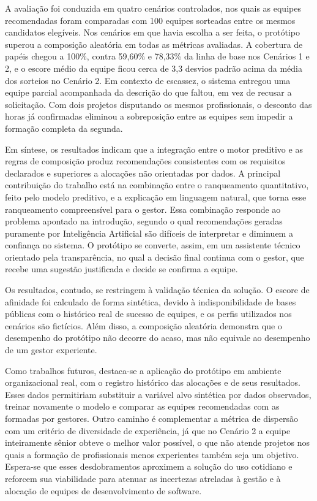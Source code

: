 A avaliação foi conduzida em quatro cenários controlados, nos quais as equipes recomendadas foram comparadas com 100 equipes sorteadas entre os mesmos candidatos elegíveis. Nos cenários em que havia escolha a ser feita, o protótipo superou a composição aleatória em todas as métricas avaliadas. A cobertura de papéis chegou a 100\%, contra 59,60\% e 78,33\% da linha de base nos Cenários 1 e 2, e o escore médio da equipe ficou cerca de 3,3 desvios padrão acima da média dos sorteios no Cenário 2. Em contexto de escassez, o sistema entregou uma equipe parcial acompanhada da descrição do que faltou, em vez de recusar a solicitação. Com dois projetos disputando os mesmos profissionais, o desconto das horas já confirmadas eliminou a sobreposição entre as equipes sem impedir a formação completa da segunda.

Em síntese, os resultados indicam que a integração entre o motor preditivo e as regras de composição produz recomendações consistentes com os requisitos declarados e superiores a alocações não orientadas por dados. A principal contribuição do trabalho está na combinação entre o ranqueamento quantitativo, feito pelo modelo preditivo, e a explicação em linguagem natural, que torna esse ranqueamento compreensível para o gestor. Essa combinação responde ao problema apontado na introdução, segundo o qual recomendações geradas puramente por Inteligência Artificial são difíceis de interpretar e diminuem a confiança no sistema. O protótipo se converte, assim, em um assistente técnico orientado pela transparência, no qual a decisão final continua com o gestor, que recebe uma sugestão justificada e decide se confirma a equipe.

Os resultados, contudo, se restringem à validação técnica da solução. O escore de afinidade foi calculado de forma sintética, devido à indisponibilidade de bases públicas com o histórico real de sucesso de equipes, e os perfis utilizados nos cenários são fictícios. Além disso, a composição aleatória demonstra que o desempenho do protótipo não decorre do acaso, mas não equivale ao desempenho de um gestor experiente.

Como trabalhos futuros, destaca-se a aplicação do protótipo em ambiente organizacional real, com o registro histórico das alocações e de seus resultados. Esses dados permitiriam substituir a variável alvo sintética por dados observados, treinar novamente o modelo e comparar as equipes recomendadas com as formadas por gestores. Outro caminho é complementar a métrica de dispersão com um critério de diversidade de experiência, já que no Cenário 2 a equipe inteiramente sênior obteve o melhor valor possível, o que não atende projetos nos quais a formação de profissionais menos experientes também seja um objetivo. Espera-se que esses desdobramentos aproximem a solução do uso cotidiano e reforcem sua viabilidade para atenuar as incertezas atreladas à gestão e à alocação de equipes de desenvolvimento de software.
